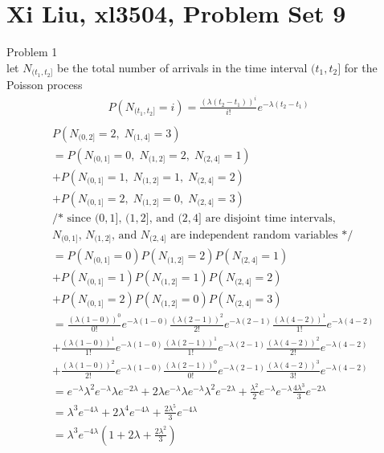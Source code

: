 \documentclass[12pt,border=4pt,multi]{article} %
\begin{document}
\section*{Xi Liu, xl3504, Problem Set 9}
Problem 1\\
let $N_{(t_1, t_2]}$ be the total number of arrivals in the time interval $(t_1, t_2]$ for the Poisson process
\begin{align*}
P(N_{(t_1, t_2]} = i) = \frac{(\lambda (t_2 - t_1))^i}{i!} e^{-\lambda (t_2 - t_1)}\\
\end{align*}
\begin{align*}
&P(N_{(0, 2]} = 2,\; N_{(1, 4]} = 3)\\ 
&= P(N_{(0, 1]} = 0,\; N_{(1, 2]} = 2,\; N_{(2, 4]} = 1)\\
&+ P(N_{(0, 1]} = 1,\; N_{(1, 2]} = 1,\; N_{(2, 4]} = 2)\\
&+ P(N_{(0, 1]} = 2,\; N_{(1, 2]} = 0,\; N_{(2, 4]} = 3)\\
&\text{/* since $(0, 1]$, $(1, 2]$, and $(2, 4]$ are disjoint time intervals,}\\
&\text{$N_{(0, 1]}$, $N_{(1, 2]}$, and $N_{(2, 4]}$ are independent random variables */}\\
&= P(N_{(0, 1]} = 0)P(N_{(1, 2]} = 2)P(N_{(2, 4]} = 1)\\
&+ P(N_{(0, 1]} = 1)P(N_{(1, 2]} = 1)P(N_{(2, 4]} = 2)\\
&+ P(N_{(0, 1]} = 2)P(N_{(1, 2]} = 0)P(N_{(2, 4]} = 3)\\
&= \frac{(\lambda (1 - 0))^0}{0!} e^{-\lambda (1 - 0)}\frac{(\lambda (2 - 1))^2}{2!} e^{-\lambda (2 - 1)}\frac{(\lambda (4 - 2))^1}{1!} e^{-\lambda (4 - 2)}\\
&+ \frac{(\lambda (1 - 0))^1}{1!} e^{-\lambda (1 - 0)}\frac{(\lambda (2 - 1))^1}{1!} e^{-\lambda (2 - 1)}\frac{(\lambda (4 - 2))^2}{2!} e^{-\lambda (4 - 2)}\\
&+ \frac{(\lambda (1 - 0))^2}{2!} e^{-\lambda (1 - 0)}\frac{(\lambda (2 - 1))^0}{0!} e^{-\lambda (2 - 1)}\frac{(\lambda (4 - 2))^3}{3!} e^{-\lambda (4 - 2)}\\
&= e^{-\lambda}\lambda^2 e^{-\lambda}\lambda e^{-2\lambda} + 2\lambda e^{-\lambda}\lambda e^{-\lambda}\lambda^2 e^{-2\lambda} + \frac{\lambda^2}{2} e^{-\lambda} e^{-\lambda}\frac{4\lambda^3}{3} e^{-2\lambda}\\
&= \lambda^3 e^{-4\lambda} + 2\lambda^4 e^{-4\lambda} + \frac{2\lambda^5}{3}e^{-4\lambda}\\
&= \boxed{\lambda^3 e^{-4\lambda}\left(1 + 2\lambda + \frac{2\lambda^2}{3}\right)}\\
\end{align*}
\end{document}

